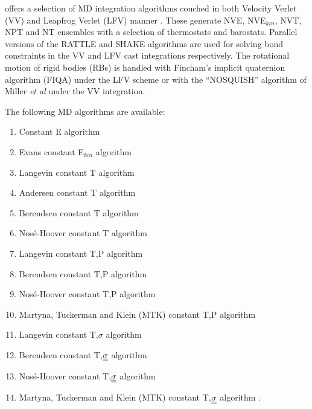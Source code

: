 \D offers a selection of MD integration algorithms
couched in both Velocity Verlet (VV) and Leapfrog Verlet (LFV)
manner   \cite{allen-89a}.
These generate NVE, NVE$_{kin}$, NVT, NPT and N\mat{\sigma}T
ensembles with a selection of
thermostats and barostats.
Parallel versions of the RATTLE
\cite{andersen-83a} and SHAKE
\cite{smith-94b} algorithms are used for solving bond
constraints in the VV and LFV cast
integrations respectively.  The rotational motion of
rigid bodies (RBs) is handled with Fincham's
implicit quaternion algorithm
(FIQA) \cite{fincham-92a} under the LFV scheme or with the
``NOSQUISH'' algorithm of Miller {\em et al} 
\cite{miller-02a} under the VV integration.

The following MD algorithms are available:
\begin{enumerate}
\item Constant E algorithm
\item Evans constant E$_{kin}$ algorithm \cite{evans-84a}
\item Langevin constant T algorithm \cite{adelman-76a}
\item Andersen constant T algorithm \cite{andersen-79a}
\item Berendsen constant T algorithm \cite{berendsen-84a}
\item Nos\'{e}-Hoover constant T algorithm \cite{hoover-85a}
\item Langevin constant T,P algorithm \cite{quigley-04}
\item Berendsen constant T,P algorithm \cite{berendsen-84a}
\item Nos\'{e}-Hoover constant T,P algorithm \cite{hoover-85a}
\item Martyna, Tuckerman and Klein (MTK) constant T,P algorithm \cite{martyna-96a}
\item Langevin constant T,$\sigma$ algorithm \cite{quigley-04}
\item Berendsen constant T,$\mbox{$\underline{\underline{\bf \sigma}}$}$ algorithm \cite{berendsen-84a}
\item Nos\'{e}-Hoover constant T,$\mbox{$\underline{\underline{\bf \sigma}}$}$ algorithm \cite{hoover-85a}
\item Martyna, Tuckerman and Klein (MTK) constant T,$\mbox{$\underline{\underline{\bf \sigma}}$}$ algorithm \cite{martyna-96a}.
\end{enumerate}

